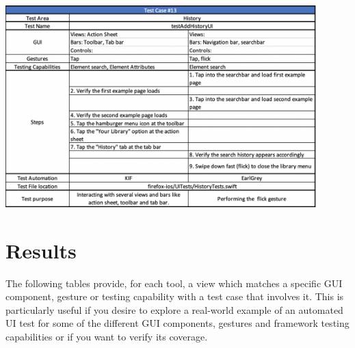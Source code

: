 \includegraphics[width=12cm]{img/tc13.png} \\[2mm]

\section{Results}
The following tables provide, for each tool, a view which matches a specific GUI component, gesture or testing capability with a test case that involves it. This is particularly useful if you desire to explore a real-world example of an automated UI test for some of the different GUI components, gestures and framework testing capabilities or if you want to verify its coverage.


